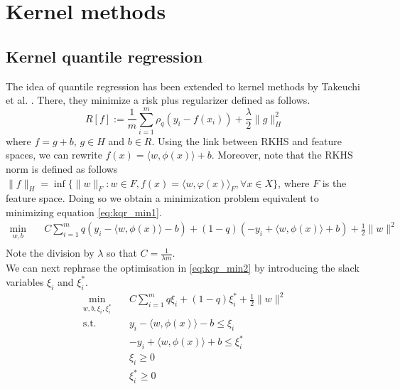 \section{Kernel methods}
\subsection{Kernel quantile regression}
The idea of quantile regression has been extended to kernel methods by Takeuchi et al. \cite{takeuchi2006nonparametric}.
There, they minimize a risk plus regularizer defined as follows.
\begin{equation}\label{eq:kqr_min1}
    R[f]:=\frac{1}{m}\sum\limits_{i=1}^{m}\rho_q(y_i-f(x_i))+\frac{\lambda}{2}\|g\|_H^2
\end{equation}
where $f=g+b$, $g \in H$ and $b \in R$.
Using the link between RKHS and feature spaces, we can rewrite $f(x)=\langle w, \phi(x) \rangle+b$. Moreover, note that the RKHS norm is defined as follows $\|f\|_{H}=\inf\{\|w\|_{F}:w\in F,f(x)=\langle w,\varphi (x)\rangle _{F},\forall x\in X\}$, where $F$ is the feature space.
 Doing so we obtain a minimization problem equivalent to minimizing equation \ref{eq:kqr_min1}.
\begin{equation}\label{eq:kqr_min2}
    \begin{aligned}
    \min_{w,b} \quad & C \sum \limits_{i=1}^{m}
    q(y_i-\langle w, \phi(x) \rangle-b)+ (1-q)(-y_i+\langle w, \phi(x) \rangle+b)+ \frac{1}{2}\|w\|^2\\
    \end{aligned}
    \end{equation}
Note the division by $\lambda$ so that $C=\frac{1}{\lambda m}$.
\\
We can next rephrase the optimisation in \ref{eq:kqr_min2} by introducing the slack variables $\xi_i$ and $\xi_i^*$.
\begin{equation}\label{eq:kqr_min3}
    \begin{aligned}
        \min_{w,b,\xi_i,\xi_i^*} \quad & C \sum \limits_{i=1}^{m}
        q \xi_i+ (1-q)\xi_i^*+ \frac{1}{2}\|w\|^2\\
    \textrm{s.t.} \quad & y_i-\langle w, \phi(x) \rangle-b \leq \xi_i\\
    & -y_i+\langle w, \phi(x) \rangle+b \leq \xi_i^*\\
      &\xi_i\geq0    \\
      &\xi_i^*\geq0    \\
    \end{aligned}
    \end{equation}
